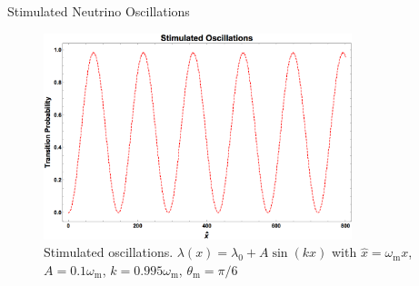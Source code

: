 \documentclass[9pt]{beamer}
\begin{document}
\begin{frame}{Stimulated Neutrino Oscillations}
{\begin{figure}
\includegraphics[width=0.8\textwidth]{assets/stimulated-oscillation-phenomenon.png}
\caption*{Stimulated oscillations. $\lambda(x) = \lambda_0 +  A \sin (k x)$  with $\hat x = \omega_{\mathrm m} x $, $A=0.1\omega_{\mathrm m}$, $k=0.995\omega_{\mathrm m}$, $\theta_{\mathrm{m}}=\pi/6$}
\end{figure}


}





\end{frame}
\end{document}
